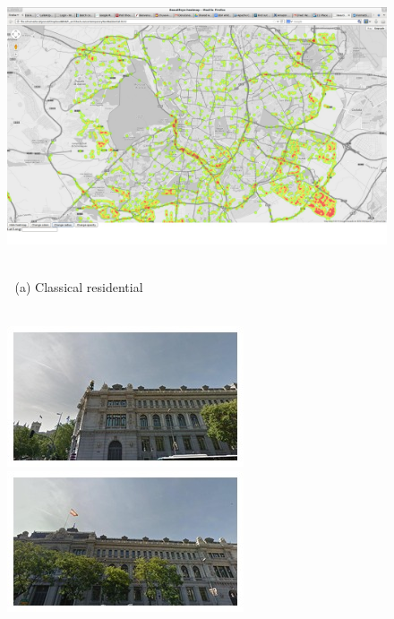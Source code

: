 \begin{figure}
\begin{minipage}{\linewidth}
\begin{minipage}{0.3\linewidth}
    \end{minipage}
    \begin{minipage}{0.7\linewidth}
      \includegraphics[trim= 350 150 250 150, clip=true, width=\linewidth]{imgs/arch/mapS4.jpg}
    \end{minipage}
  \end{minipage}
  \\
  $\;$ \hspace{30mm} (a) Classical residential
  \\
  \\
  \begin{minipage}{\linewidth}
    \begin{minipage}{0.3\linewidth}
      \includegraphics[width=0.49\linewidth]{imgs/arch/mosaicsS1/mosaic0000.jpg}
      \includegraphics[width=0.49\linewidth]{imgs/arch/mosaicsS1/mosaic0001.jpg}
      \\ \vspace{-3mm} \\

\end{minipage}
\end{minipage}
\end{figure}
